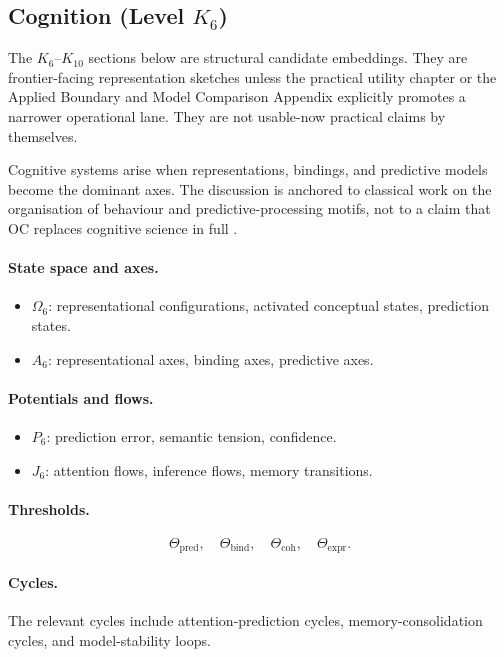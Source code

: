 \subsection{Cognition (Level \texorpdfstring{$K_6$}{K6})}

The \(K_6\)--\(K_{10}\) sections below are structural candidate embeddings.
They are frontier-facing representation sketches unless
the practical utility chapter or
the Applied Boundary and Model Comparison Appendix explicitly promotes a
narrower operational lane. They are not usable-now practical claims by
themselves.

Cognitive systems arise when representations, bindings, and predictive models
become the dominant axes.
The discussion is anchored to classical work on the organisation of behaviour and
predictive-processing motifs, not to a claim that OC replaces cognitive
science in full \parencite{hebb_organization,friston_free_energy}.

\paragraph{State space and axes.}
\begin{itemize}
  \item \(\Omega_6\): representational configurations, activated conceptual
        states, prediction states.
  \item \(A_6\): representational axes, binding axes, predictive axes.
\end{itemize}

\paragraph{Potentials and flows.}
\begin{itemize}
  \item \(P_6\): prediction error, semantic tension, confidence.
  \item \(J_6\): attention flows, inference flows, memory transitions.
\end{itemize}

\paragraph{Thresholds.}
\[
  \Theta_{\mathrm{pred}},\quad
  \Theta_{\mathrm{bind}},\quad
  \Theta_{\mathrm{coh}},\quad
  \Theta_{\mathrm{expr}}.
\]

\paragraph{Cycles.}
The relevant cycles include attention-prediction cycles, memory-consolidation
cycles, and model-stability loops.

